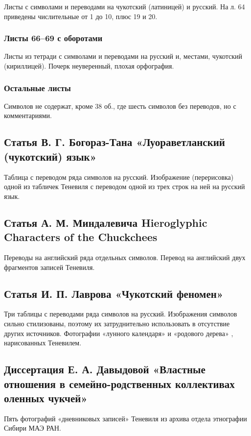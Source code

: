 \documentclass{article}
\newcounter{glyph}
\begin{document}
Листы с символами и переводами на чукотский (латиницей) и русский. На л. 64 приведены числительные от 1 до 10, плюс 19 и 20.

\subsubsection{Листы 66–69 с оборотами}

Листы из тетради с символами и переводами на русский и, местами, чукотский (кириллицей). Почерк неуверенный, плохая орфография.

\subsubsection{Остальные листы}

Символов не содержат, кроме 38 об., где шесть символов без переводов, но с комментариями.

\subsection{Статья В. Г. Богораз-Тана «Луораветланский (чукотский) язык»}

Таблица с переводом ряда символов на русский. Изображение (перерисовка) одной из табличек Теневиля с переводом одной из трех строк на ней на русский язык.

\subsection{Статья А. М. Миндалевича Hieroglyphic Characters of the Chuckchees}

Переводы на английский ряда отдельных символов. Перевод на английский двух фрагментов записей Теневиля.

\subsection{Статья И. П. Лаврова «Чукотский феномен»}

Три таблицы с переводами ряда символов на русский. Изображения символов сильно стилизованы, поэтому их затруднительно использовать в отсутствие других источников. Фотографии «лунного календаря» и «родового дерева» , нарисованных Теневилем.

\subsection{Диссертация Е. А. Давыдовой «Властные отношения в семейно-родственных коллективах оленных чукчей»}

Пять фотографий «дневниковых записей» Теневиля из архива отдела этнографии Сибири МАЭ РАН.

\printbibliography
\end{document}
